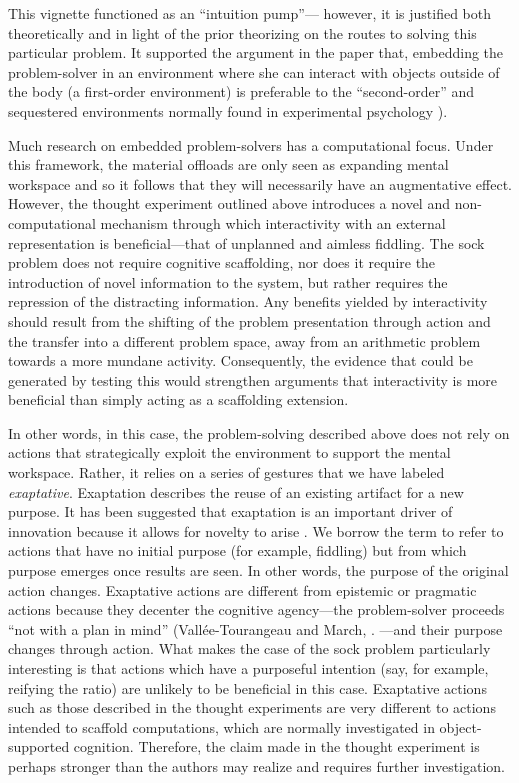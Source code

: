 \documentclass{article}
\begin{document}
This vignette functioned as an “intuition pump”— however, it is justified both theoretically and in light of the prior theorizing on the routes to solving this particular problem. It supported the argument in the paper that, embedding the problem-solver in an environment where she can interact with objects outside of the body (a first-order environment) is preferable to the “second-order” and sequestered environments normally found in experimental psychology \parencite{Vallée-Tourangeau2020}\parencite{Vallée-Tourangeau2014}). 

Much research on embedded problem-solvers has a computational focus. Under this framework, the material offloads are only seen as expanding mental workspace and so it follows that they will necessarily have an augmentative effect. However, the thought experiment outlined above introduces a novel and non-computational mechanism through which interactivity with an external representation is beneficial—that of unplanned and aimless fiddling. The sock problem does not require cognitive scaffolding, nor does it require the introduction of novel information to the system, but rather requires the repression of the distracting information. Any benefits yielded by interactivity should result from the shifting of the problem presentation through action and the transfer into a different problem space, away from an arithmetic problem towards a more mundane activity. Consequently, the evidence that could be generated by testing this would strengthen arguments that interactivity is more beneficial than simply acting as a scaffolding extension. 

In other words, in this case, the problem-solving described above does not rely on actions that strategically exploit the environment to support the mental workspace. Rather, it relies on a series of gestures that we have labeled \emph{exaptative}. Exaptation describes the reuse of an existing artifact for a new purpose. It has been suggested that exaptation is an important driver of innovation because it allows for novelty to arise \parencite{Andriani2017}. We borrow the term to refer to actions that have no initial purpose (for example, fiddling) but from which purpose emerges once results are seen. In other words, the purpose of the original action changes. Exaptative actions are different from epistemic or pragmatic actions \parencite{Kirsh1994} because they decenter the cognitive agency—the problem-solver proceeds “not with a plan in mind” (Vallée-Tourangeau and March, \parencite[3][undefined]{Vallée-Tourangeau2019}. —and their purpose changes through action. What makes the case of the sock problem particularly interesting is that actions which have a purposeful intention (say, for example, reifying the ratio) are unlikely to be beneficial in this case. Exaptative actions such as those described in the thought experiments are very different to actions intended to scaffold computations, which are normally investigated in object-supported cognition. Therefore, the claim made in the thought experiment is perhaps stronger than the authors may realize and requires further investigation.
\end{document}
